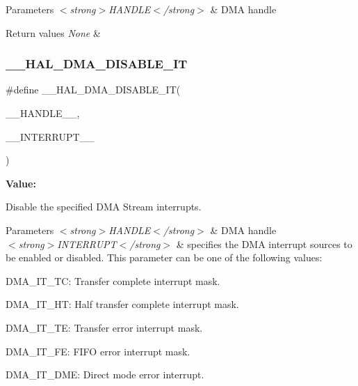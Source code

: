 \begin{DoxyParams}{Parameters}
{\em $<$strong$>$\+H\+A\+N\+D\+L\+E$<$/strong$>$} & D\+MA handle \\
\hline
\end{DoxyParams}

\begin{DoxyRetVals}{Return values}
{\em None} & \\
\hline
\end{DoxyRetVals}
\mbox{\label{group___d_m_a_ga2867eab09398df2daac55c3f327654da}} 
\subsubsection{\texorpdfstring{\_\_HAL\_DMA\_DISABLE\_IT}{\_\_HAL\_DMA\_DISABLE\_IT}}
{\footnotesize\ttfamily \#define \+\_\+\+\_\+\+H\+A\+L\+\_\+\+D\+M\+A\+\_\+\+D\+I\+S\+A\+B\+L\+E\+\_\+\+IT(\begin{DoxyParamCaption}\item[{}]{\+\_\+\+\_\+\+H\+A\+N\+D\+L\+E\+\_\+\+\_\+,  }\item[{}]{\+\_\+\+\_\+\+I\+N\+T\+E\+R\+R\+U\+P\+T\+\_\+\+\_\+ }\end{DoxyParamCaption})}

{\bfseries Value\+:}
\begin{DoxyCode}{0}

\end{DoxyCode}


Disable the specified D\+MA Stream interrupts. 


\begin{DoxyParams}{Parameters}
{\em $<$strong$>$\+H\+A\+N\+D\+L\+E$<$/strong$>$} & D\+MA handle \\
\hline
{\em $<$strong$>$\+I\+N\+T\+E\+R\+R\+U\+P\+T$<$/strong$>$} & specifies the D\+MA interrupt sources to be enabled or disabled. This parameter can be one of the following values\+: \begin{DoxyItemize}
\item D\+M\+A\+\_\+\+I\+T\+\_\+\+TC\+: Transfer complete interrupt mask. \item D\+M\+A\+\_\+\+I\+T\+\_\+\+HT\+: Half transfer complete interrupt mask. \item D\+M\+A\+\_\+\+I\+T\+\_\+\+TE\+: Transfer error interrupt mask. \item D\+M\+A\+\_\+\+I\+T\+\_\+\+FE\+: F\+I\+FO error interrupt mask. \item D\+M\+A\+\_\+\+I\+T\+\_\+\+D\+ME\+: Direct mode error interrupt. \end{DoxyItemize}
\\
\hline
\end{DoxyParams}

